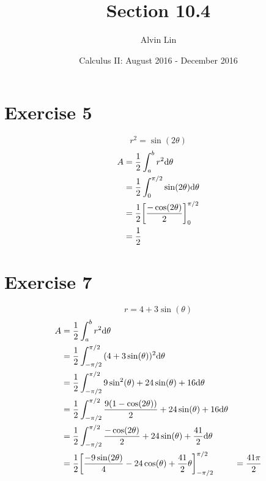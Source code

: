 \documentclass[letterpaper, 12pt]{math}
\title{Section 10.4}
\author{Alvin Lin}
\date{Calculus II: August 2016 - December 2016}
\begin{document}
\maketitle

\section*{Exercise 5}
\[ r^{2} = \sin(2\theta) \]
\begin{align*}
  A &= \frac{1}{2}\int_{a}^{b}{r^{2}\mathrm{d}{\theta}} \\
  &= \frac{1}{2}\int_{0}^{\pi/2}{\sin(2\theta)\mathrm{d}{\theta}} \\
  &= \frac{1}{2}\bigg[\frac{-\cos(2\theta)}{2}\bigg]_{0}^{\pi/2} \\
  &= \frac{1}{2}
\end{align*}

\section*{Exercise 7}
\[ r = 4+3\sin(\theta) \]
\begin{align*}
  A &= \frac{1}{2}\int_{a}^{b}{r^{2}\mathrm{d}{\theta}} \\
  &= \frac{1}{2}\int_{-\pi/2}^{\pi/2}{(4+3\sin(\theta))^{2}\mathrm{d}{\theta}} \\
  &= \frac{1}{2}\int_{-\pi/2}^{\pi/2}
    {9\sin^{2}(\theta)+24\sin(\theta)+16\mathrm{d}{\theta}} \\
  &= \frac{1}{2}\int_{-\pi/2}^{\pi/2}
    {\frac{9(1-\cos(2\theta))}{2}+24\sin(\theta)+16\mathrm{d}{\theta}} \\
  &= \frac{1}{2}\int_{-\pi/2}^{\pi/2}
    {\frac{-\cos(2\theta)}{2}+24\sin(\theta)+\frac{41}{2}\mathrm{d}{\theta}} \\
  &= \frac{1}{2}\bigg[
    \frac{-9\sin(2\theta)}{4}-24\cos(\theta)+
      \frac{41}{2}\theta\bigg]_{-\pi/2}^{\pi/2}
  &= \frac{41\pi}{2}
\end{align*}
\end{document}
